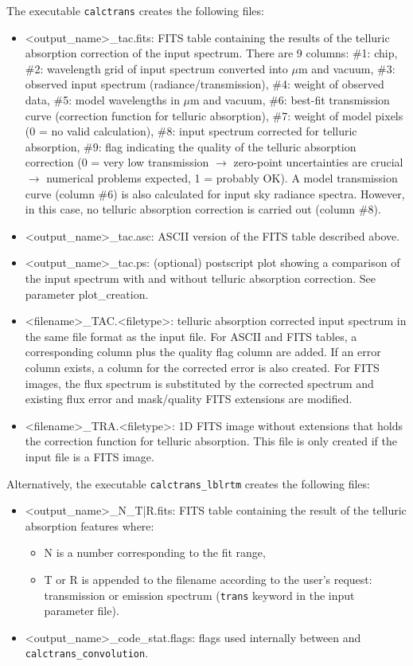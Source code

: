 The executable {\tt calctrans} creates the following files:
\begin{itemize}
\item <{\sc output\_name}>\_tac.fits: FITS table containing the results of
the telluric absorption correction of the input spectrum. There are 9 columns:
\#1: chip, \#2: wavelength grid of input spectrum converted into $\mu$m and
vacuum, \#3: observed input spectrum (radiance/transmission), \#4: weight of
observed data, \#5: model wavelengths in $\mu$m and vacuum, \#6: best-fit
transmission curve (correction function for telluric absorption),
\#7: weight of model pixels (0 = no valid calculation), \#8: input spectrum
corrected for telluric absorption, \#9: flag indicating the quality of the
telluric absorption correction (0 = very low transmission $\to$ zero-point
uncertainties are crucial $\to$ numerical problems expected, 1 = probably OK).
A model transmission curve (column \#6) is also calculated for input sky
radiance spectra. However, in this case, no telluric absorption correction
is carried out (column \#8).
\item <{\sc output\_name}>\_tac.asc: ASCII version of the FITS table described
above.
\item <{\sc output\_name}>\_tac.ps: (optional) postscript plot showing a
comparison of the input spectrum with and without telluric absorption
correction. See parameter {\sc plot\_creation}.
\item <{\sc filename}>\_TAC.<filetype>: telluric absorption corrected input
spectrum in the same file format as the input file. For ASCII and FITS tables,
a corresponding column plus the quality flag column are added. If an error
column exists, a column for the corrected error is also created. For FITS
images, the flux spectrum is substituted by the corrected spectrum and
existing flux error and mask/quality FITS extensions are modified.
\item <{\sc filename}>\_TRA.<filetype>: 1D FITS image without extensions that
holds the correction function for telluric absorption. This file is only
created if the input file is a FITS image.
\end{itemize}
Alternatively, the executable {\tt calctrans\_lblrtm} creates the following
files:
\begin{itemize}
\item <{\sc output\_name}>\_N\_T|R.fits: FITS table containing the result of
    the telluric absorption features where:
    \begin{itemize}
    \item N is a number corresponding to the fit range,
    \item T or R is appended to the filename according to the user's
        request: transmission or emission spectrum ({\tt trans} keyword in
        the input parameter file).
    \end{itemize}
\item <{\sc output\_name}>\_code\_stat.flags: flags used internally between
     and {\tt calctrans\_convolution}.
\end{itemize}
